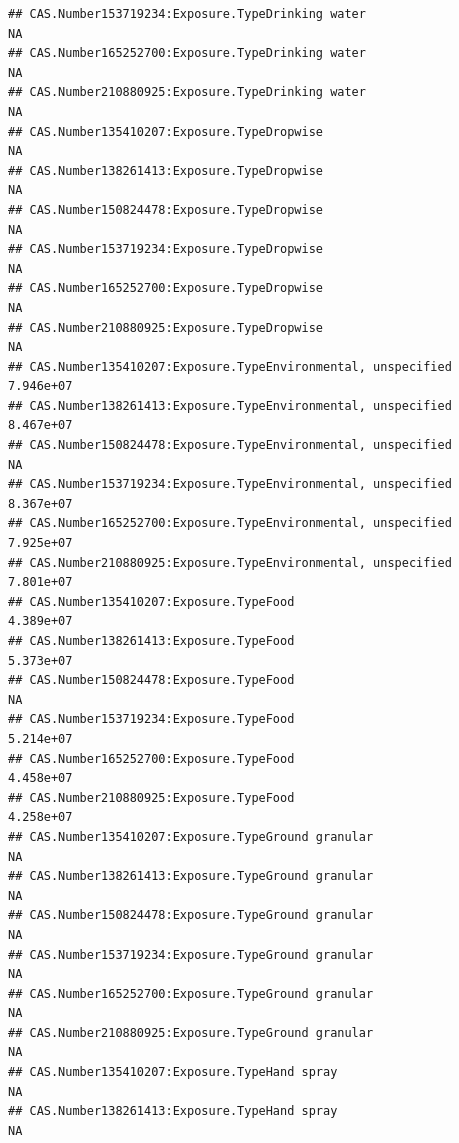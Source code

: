 \documentclass[
  12pt,
]{article}
\begin{document}
\begin{verbatim}
## CAS.Number153719234:Exposure.TypeDrinking water                                     NA
## CAS.Number165252700:Exposure.TypeDrinking water                                     NA
## CAS.Number210880925:Exposure.TypeDrinking water                                     NA
## CAS.Number135410207:Exposure.TypeDropwise                                           NA
## CAS.Number138261413:Exposure.TypeDropwise                                           NA
## CAS.Number150824478:Exposure.TypeDropwise                                           NA
## CAS.Number153719234:Exposure.TypeDropwise                                           NA
## CAS.Number165252700:Exposure.TypeDropwise                                           NA
## CAS.Number210880925:Exposure.TypeDropwise                                           NA
## CAS.Number135410207:Exposure.TypeEnvironmental, unspecified                  7.946e+07
## CAS.Number138261413:Exposure.TypeEnvironmental, unspecified                  8.467e+07
## CAS.Number150824478:Exposure.TypeEnvironmental, unspecified                         NA
## CAS.Number153719234:Exposure.TypeEnvironmental, unspecified                  8.367e+07
## CAS.Number165252700:Exposure.TypeEnvironmental, unspecified                  7.925e+07
## CAS.Number210880925:Exposure.TypeEnvironmental, unspecified                  7.801e+07
## CAS.Number135410207:Exposure.TypeFood                                        4.389e+07
## CAS.Number138261413:Exposure.TypeFood                                        5.373e+07
## CAS.Number150824478:Exposure.TypeFood                                               NA
## CAS.Number153719234:Exposure.TypeFood                                        5.214e+07
## CAS.Number165252700:Exposure.TypeFood                                        4.458e+07
## CAS.Number210880925:Exposure.TypeFood                                        4.258e+07
## CAS.Number135410207:Exposure.TypeGround granular                                    NA
## CAS.Number138261413:Exposure.TypeGround granular                                    NA
## CAS.Number150824478:Exposure.TypeGround granular                                    NA
## CAS.Number153719234:Exposure.TypeGround granular                                    NA
## CAS.Number165252700:Exposure.TypeGround granular                                    NA
## CAS.Number210880925:Exposure.TypeGround granular                                    NA
## CAS.Number135410207:Exposure.TypeHand spray                                         NA
## CAS.Number138261413:Exposure.TypeHand spray                                         NA

\end{verbatim}
\end{document}
